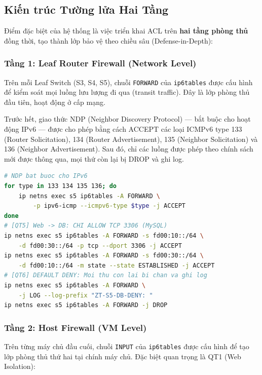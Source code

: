 \subsection{Kiến trúc Tường lửa Hai Tầng}

Điểm đặc biệt của hệ thống là việc triển khai ACL trên \textbf{hai tầng phòng thủ} đồng thời, tạo thành lớp bảo vệ theo chiều sâu (Defense-in-Depth):

\subsubsection{Tầng 1: Leaf Router Firewall (Network Level)}

Trên mỗi Leaf Switch (S3, S4, S5), chuỗi \texttt{FORWARD} của \texttt{ip6tables} được cấu hình để kiểm soát mọi luồng lưu lượng đi qua (transit traffic). Đây là lớp phòng thủ đầu tiên, hoạt động ở cấp mạng.

Trước hết, giao thức NDP (Neighbor Discovery Protocol) — bắt buộc cho hoạt động IPv6 — được cho phép bằng cách ACCEPT các loại ICMPv6 type 133 (Router Solicitation), 134 (Router Advertisement), 135 (Neighbor Solicitation) và 136 (Neighbor Advertisement). Sau đó, chỉ các luồng được phép theo chính sách mới được thông qua, mọi thứ còn lại bị DROP và ghi log.

\begin{lstlisting}[style=customcode, language=bash, caption={Cấu hình Leaf S5 — Bảo vệ lõi Database.}, label=lst:leaf_s5]
# NDP bat buoc cho IPv6
for type in 133 134 135 136; do
    ip netns exec s5 ip6tables -A FORWARD \
        -p ipv6-icmp --icmpv6-type $type -j ACCEPT
done
# [QT5] Web -> DB: CHI ALLOW TCP 3306 (MySQL)
ip netns exec s5 ip6tables -A FORWARD -s fd00:10::/64 \
    -d fd00:30::/64 -p tcp --dport 3306 -j ACCEPT
ip netns exec s5 ip6tables -A FORWARD -s fd00:30::/64 \
    -d fd00:10::/64 -m state --state ESTABLISHED -j ACCEPT
# [QT6] DEFAULT DENY: Moi thu con lai bi chan va ghi log
ip netns exec s5 ip6tables -A FORWARD \
    -j LOG --log-prefix "ZT-S5-DB-DENY: "
ip netns exec s5 ip6tables -A FORWARD -j DROP
\end{lstlisting}

\subsubsection{Tầng 2: Host Firewall (VM Level)}

Trên từng máy chủ đầu cuối, chuỗi \texttt{INPUT} của \texttt{ip6tables} được cấu hình để tạo lớp phòng thủ thứ hai tại chính máy chủ. Đặc biệt quan trọng là QT1 (Web Isolation):

